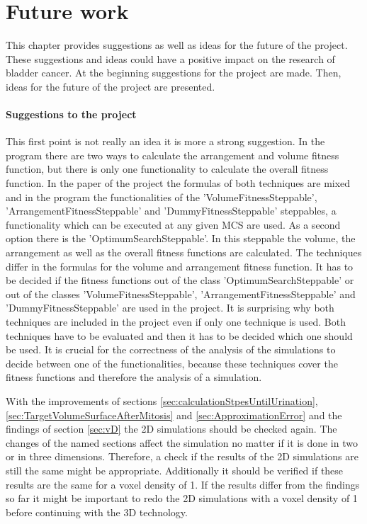 \chapter{Future work}
This chapter provides suggestions as well as ideas for the future of the project. These suggestions and ideas could have a positive impact on the research of bladder cancer. At the beginning suggestions for the project are made. Then, ideas for the future of the project are presented.

\subsubsection{Suggestions to the project}
This first point is not really an idea it is more a strong suggestion. In the program there are two ways to calculate the arrangement and volume fitness function, but there is only one functionality to calculate the overall fitness function. In the paper of the project \cite{Torelli2017} the formulas of both techniques are mixed and in the program the functionalities of the 'VolumeFitnessSteppable', 'ArrangementFitnessSteppable' and 'DummyFitnessSteppable' steppables, a functionality which can be executed at any given \ac{MCS} are used. As a second option there is the 'OptimumSearchSteppable'. In this steppable the volume, the arrangement as well as the overall fitness functions are calculated. The techniques differ in the formulas for the volume and arrangement fitness function. It has to be decided if the fitness functions out of the class 'OptimumSearchSteppable' or out of the classes 'VolumeFitnessSteppable', 'ArrangementFitnessSteppable' and 'DummyFitnessSteppable' are used in the project. It is surprising why both techniques are included in the project even if only one technique is used. \newline
Both techniques have to be evaluated and then it has to be decided which one should be used. It is crucial for the correctness of the analysis of the simulations to decide between one of the functionalities, because these techniques cover the fitness functions and therefore the analysis of a simulation.


With the improvements of sections \ref{sec:calculationStpesUntilUrination}, \ref{sec:TargetVolumeSurfaceAfterMitosis} and \ref{sec:ApproximationError} and the findings of section \ref{sec:vD} the 2D simulations should be checked again. The changes of the named sections affect the simulation no matter if it is done in two or in three dimensions. Therefore, a check if the results of the 2D simulations are still the same might be appropriate. Additionally it should be verified if these results are the same for a voxel density of 1. If the results differ from the findings so far it might be important to redo the 2D simulations with a voxel density of 1 before continuing with the 3D technology.

